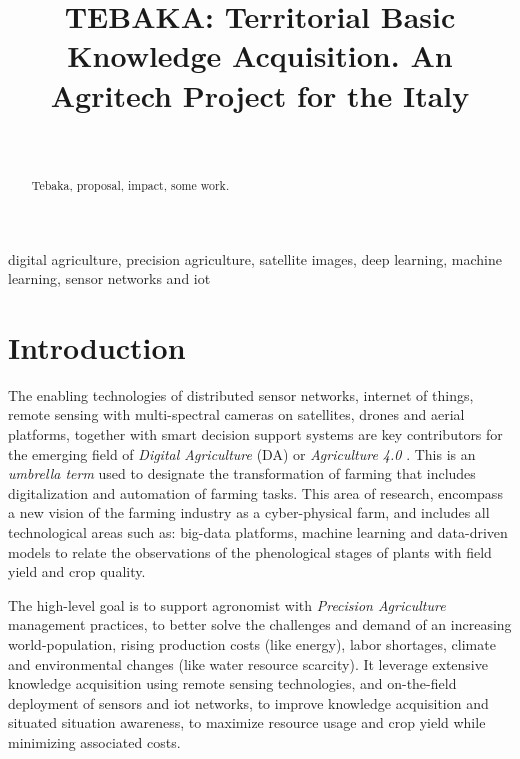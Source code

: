 \documentclass[a4paper, comsoc]{IEEEtran}
\begin{document}

\title{TEBAKA: Territorial Basic Knowledge Acquisition. An Agritech Project for the Italy}
\author{\\
}

\maketitle

\begin{abstract}
Tebaka, proposal, impact, some work.
\end{abstract}

\begin{IEEEkeywords}
digital agriculture, precision agriculture, satellite images, deep learning, machine learning,
sensor networks and iot
\end{IEEEkeywords}


\section{Introduction}

The enabling technologies of distributed sensor networks, internet of things, remote sensing with multi-spectral cameras on satellites, drones and aerial platforms, together with smart decision support systems are key contributors for the emerging field of \emph{Digital Agriculture} (DA) or \emph{Agriculture 4.0} \cite{de2018agriculture}. 
This is an \emph{umbrella term} used to designate the transformation of farming that includes digitalization and automation of farming tasks. This area of research, encompass a new vision of the farming industry as a cyber-physical farm, and includes all technological areas such as: big-data platforms, machine learning and data-driven models to relate the observations of the phenological stages of plants with field yield and crop quality. 

The high-level goal is to support agronomist with \emph{Precision Agriculture} management practices, to better solve the challenges and demand of an increasing world-population, rising production costs (like energy), labor shortages, climate and environmental changes (like water resource scarcity). It leverage extensive knowledge acquisition using remote sensing technologies, and on-the-field deployment of sensors and iot networks, to improve knowledge acquisition and situated situation awareness, to maximize resource usage and crop yield while minimizing associated costs.
\end{document}
